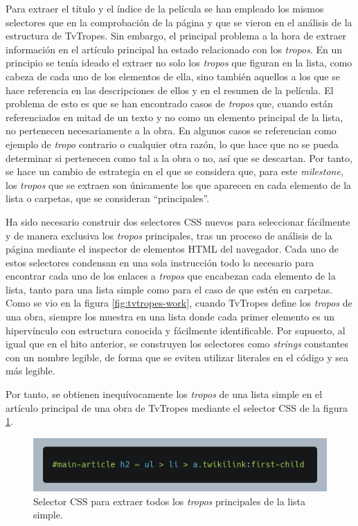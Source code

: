 Para extraer el título y el índice de la película se han empleado los mismos
selectores que en la comprobación de la página y que se vieron en el
análisis de la estructura de TvTropes. Sin embargo, el principal problema a la
hora de extraer información en el artículo principal ha estado relacionado con
los \textit{tropos}. En un principio se tenía ideado el extraer no solo los
\textit{tropos} que figuran en la lista, como cabeza de cada uno de los
elementos de ella, sino también aquellos a los que se hace referencia en las
descripciones de ellos y en el resumen de la película. El problema de esto es
que se han encontrado casos de \textit{tropos} que, cuando están referenciados
en mitad de un texto y no como un elemento principal de la lista, no pertenecen
necesariamente a la obra. En algunos casos se referencian como ejemplo de
\textit{tropo} contrario o cualquier otra razón, lo que hace que no se pueda
determinar si pertenecen como tal a la obra o no, así que se descartan. Por
tanto, se hace un cambio de estrategia en el que se considera que, para este
\textit{milestone}, los \textit{tropos} que se extraen son únicamente los que
aparecen en cada elemento de la lista o carpetas, que se consideran
``principales''.

Ha sido necesario construir dos selectores CSS nuevos para seleccionar
fácilmente y de manera exclusiva los \textit{tropos} principales, tras un
proceso de análisis de la página mediante el inspector de elementos HTML del
navegador. Cada uno de estos selectores condensan en una sola instrucción todo
lo necesario para encontrar cada uno de los enlaces a \textit{tropos} que
encabezan cada elemento de la lista, tanto para una lista simple como para el
caso de que estén en carpetas. Como se vio en la figura \ref{fig:tvtropes-work},
cuando TvTropes define los \textit{tropos} de una obra, siempre los muestra en
una lista donde cada primer elemento es un hipervínculo con estructura conocida
y fácilmente identificable. Por supuesto, al igual que en el hito anterior, se
construyen los selectores como \textit{strings} constantes con un nombre
legible, de forma que se eviten utilizar literales en el código y sea más
legible.

Por tanto, se obtienen inequívocamente los \textit{tropos} de una lista simple
en el artículo principal de una obra de TvTropes mediante el selector CSS de
la figura \ref{fig:selector-lista}.

\begin{figure}[H]
    \includegraphics[width=\textwidth]{img/selector-tropes.png}
    \caption{Selector CSS para extraer todos los \textit{tropos} principales de
    la lista simple.}
    \label{fig:selector-lista}
\end{figure}


